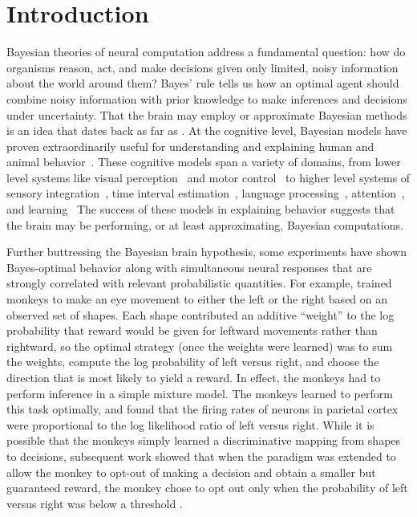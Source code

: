 \section{Introduction}
Bayesian theories of neural computation address a fundamental
question: how do organisms reason, act, and make decisions given only
limited, noisy information about the world around them?  Bayes' rule
tells us how an optimal agent should combine noisy information with
prior knowledge to make inferences and decisions under uncertainty.
That the brain may employ or approximate Bayesian methods is an idea
that dates back as far as \citet{helmholtz1925treatise}.  At the
cognitive level, Bayesian models have proven extraordinarily useful
for understanding and explaining human and animal
behavior~\cite{tenenbaum2011grow, griffiths2008bayesian}. These
cognitive models span a variety of domains, from lower level systems
like visual perception~\cite{knill1996perception,
  brainard1997bayesian, weiss2002motion, yuille2006vision,
  Stocker2006, Simoncelli2009} and motor control~\cite{Kording2004} to
higher level systems of sensory integration~\cite{ernst2002humans},
time interval estimation~\cite{jazayeri2010temporal}, 
language processing~\cite{chater2006probabilistic},
attention~\cite{whiteley2012attention, chikkerur2010,
  dayan2010selective}, and learning~\cite{tenenbaum2006theory,
  courville2006bayesian} The success of these models in explaining
behavior suggests that the brain may be performing, or at least
approximating, Bayesian computations.

Further buttressing the Bayesian brain hypothesis, some experiments
have shown Bayes-optimal behavior along with simultaneous neural responses
that are strongly correlated with relevant probabilistic quantities.
For example, \citet{Yang2007} trained monkeys to make an eye movement
to either the left or the right based on an observed set of shapes.
Each shape contributed an additive ``weight'' to the log probability
that reward would be given for leftward movements rather than
rightward, so the optimal strategy (once the weights were
learned) was to sum the weights, compute the log probability of left
versus right, and choose the direction that is most likely to yield a
reward.  In effect, the monkeys had to perform inference in a simple
mixture model. The monkeys learned to perform this task optimally, and
\citet{Yang2007} found that the firing rates of neurons in parietal
cortex were proportional to the log likelihood ratio of left versus
right. While it is possible that the monkeys simply learned a
discriminative mapping from shapes to decisions, subsequent work
showed that when the paradigm was extended to allow the monkey to
opt-out of making a decision and obtain a smaller but guaranteed
reward, the monkey chose to opt out only when the probability of
left versus right was below a threshold \cite{Kiani2009}.

